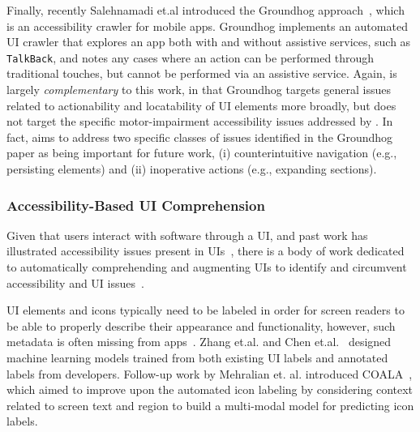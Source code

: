 Finally, recently Salehnamadi et.al introduced the Groundhog approach~\cite{Salehnamadi:ASE'22}, which is an accessibility crawler for mobile apps. Groundhog implements an automated UI crawler that explores an app both with and without assistive services, such as \texttt{\small TalkBack}, and notes any cases where an action can be performed through traditional touches, but cannot be performed via an assistive service. Again, \MotorEase is largely \textit{complementary} to this work, in that Groundhog targets general issues related to actionability and locatability of UI elements more broadly, but does not target the specific motor-impairment accessibility issues addressed by \MotorEase. In fact, \MotorEase aims to address two specific classes of issues identified in the Groundhog paper as being important for future work, (i) counterintuitive navigation (e.g., persisting elements) and (ii) inoperative actions (e.g., expanding sections).

\subsubsection{Accessibility-Based UI Comprehension}

Given that users interact with software through a UI, and past work has illustrated accessibility issues present in UIs~\cite{Salehnamadi21,Li22,Bajammal21,Peng19}, there is a body of work dedicated to automatically comprehending and augmenting UIs to identify and circumvent accessibility and UI issues~\cite{Liu21,Liu2021,Chen18,Gajos07,Shiver15,Montague12,Zhang21,Moran:ICSE'18,Moran:ASE'18}. %

UI elements and icons typically need to be labeled in order for screen readers to be able to properly describe their appearance and functionality, however, such metadata is often missing from apps~\cite{chen2020unblind}. Zhang et.al.\cite{Zhang21} and Chen et.al.~\cite{chen2020unblind} designed machine learning models trained from both existing UI labels and annotated labels from developers. %
Follow-up work by Mehralian et. al. introduced COALA~\cite{Mehralian:FSE'21}, which aimed to improve upon the automated icon labeling by considering context related to screen text and region to build a multi-modal model for predicting icon labels.

